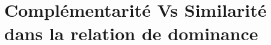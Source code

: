 \documentclass[a4paper, 11pt]{book}
\begin{document}
	

%	
%	
%	
\chapter{Complémentarité Vs Similarité dans la relation de dominance}

	
	\label{chap:dec}
	
	
\end{document}
